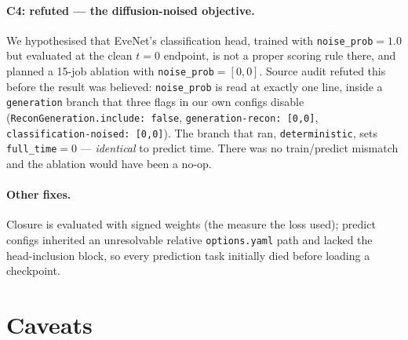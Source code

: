 \documentclass[11pt]{article}
\begin{document}
\paragraph{C4: refuted --- the diffusion-noised objective.} We hypothesised that EveNet's
classification head, trained with \texttt{noise\_prob}$=1.0$ but evaluated at the clean
$t=0$ endpoint, is not a proper scoring rule there, and planned a 15-job ablation with
\texttt{noise\_prob}$=[0,0]$. Source audit refuted this before the result was believed:
\texttt{noise\_prob} is read at exactly one line, inside a \texttt{generation} branch that
three flags in our own configs disable (\texttt{ReconGeneration.include: false},
\texttt{generation-recon: [0,0]}, \texttt{classification-noised: [0,0]}). The branch that
ran, \texttt{deterministic}, sets \texttt{full\_time}$=0$ --- \emph{identical} to predict
time. There was no train/predict mismatch and the ablation would have been a no-op.

\paragraph{Other fixes.} Closure is evaluated with signed weights (the measure the loss
used); predict configs inherited an unresolvable relative \texttt{options.yaml} path and
lacked the head-inclusion block, so every prediction task initially died before loading a
checkpoint.

\section{Caveats}
\label{sec:caveats}
\end{document}
